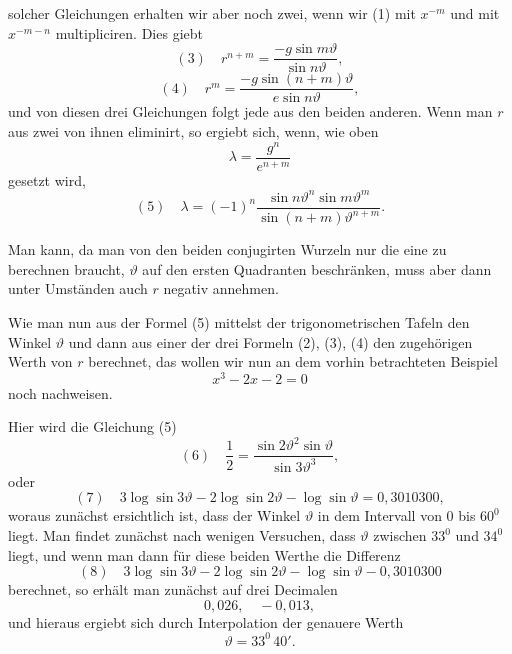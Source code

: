 solcher Gleichungen erhalten wir aber noch zwei, wenn wir (1) mit $x^{-m}$ und mit $x^{-m-n}$ multipliciren. Dies giebt
\[
(3)\quad r^{n+m} = \frac{-g\sin m\vartheta}{\sin n\vartheta},
\]
\[
(4)\quad r^m = \frac{-g\sin(n+m)\vartheta}{e\sin n\vartheta},
\]
und von diesen drei Gleichungen folgt jede aus den beiden anderen. Wenn man $r$ aus zwei von ihnen eliminirt, so ergiebt sich, wenn, wie oben
\[
\lambda = \frac{g^n}{e^{n+m}}
\]
gesetzt wird,
\[
(5)\quad \lambda = (-1)^n \frac{\sin n\vartheta^n \sin m\vartheta^m}{\sin(n+m)\vartheta^{n+m}}.
\]

Man kann, da man von den beiden conjugirten Wurzeln nur die eine zu berechnen braucht, $\vartheta$ auf den ersten Quadranten beschränken, muss aber dann unter Umständen auch $r$ negativ annehmen.

Wie man nun aus der Formel (5) mittelst der trigonometrischen Tafeln den Winkel $\vartheta$ und dann aus einer der drei Formeln (2), (3), (4) den zugehörigen Werth von $r$ berechnet, das wollen wir nun an dem vorhin betrachteten Beispiel
\[
x^3 - 2x - 2 = 0
\]
noch nachweisen.

Hier wird die Gleichung (5)
\[
(6)\quad \frac{1}{2} = \frac{\sin 2\vartheta^2 \sin\vartheta}{\sin 3\vartheta^3},
\]
oder
\[
(7)\quad 3\log\sin 3\vartheta - 2\log\sin 2\vartheta - \log\sin\vartheta = 0{,}3010300,
\]
woraus zunächst ersichtlich ist, dass der Winkel $\vartheta$ in dem Intervall von 0 bis $60^0$ liegt. Man findet zunächst nach wenigen Versuchen, dass $\vartheta$ zwischen $33^0$ und $34^0$ liegt, und wenn man dann für diese beiden Werthe die Differenz
\[
(8)\quad 3\log\sin 3\vartheta - 2\log\sin 2\vartheta - \log\sin\vartheta - 0{,}3010300
\]
berechnet, so erhält man zunächst auf drei Decimalen
\[
0{,}026, \quad -0{,}013,
\]
und hieraus ergiebt sich durch Interpolation der genauere Werth
\[
\vartheta = 33^0\,40'.
\]
